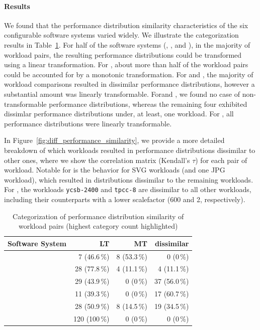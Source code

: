 \paragraph*{Results} {\color{blue} 
We found that the performance distribution similarity characteristics of the six configurable software systems varied widely. We illustrate the categorization results in Table~\ref{tab:categorization}. For half of the software systems (\kanzi, \batik, and \jadx), in the majority of workload pairs, the resulting performance distributions could be transformed using a linear transformation. For \jumper, about more than half of the workload pairs could be accounted for by a monotonic transformation. For \dconvert and \htwo, the majority of workload comparisons resulted in dissimilar performance distributions, however a substantial amount was linearly transformable. For\jumper and \jadx, we found no case of non-transformable performance distributions, whereas the remaining four exhibited dissimlar performance distributions under, at least, one workload. For \jadx, all performance distributions were linearly transformable.

In Figure~\ref{fig:diff_performance_similarity}, we provide a more detailed breakdown of which workloads resulted in performance distributions dissimilar to other ones, where we show the correlation matrix (Kendall's $\tau$) for each pair of workload. Notable for \dconvert is the behavior for SVG workloads (and one JPG workload), which resulted in distributions dissimilar to the remaining workloads. For \htwo, the workloads \texttt{ycsb-2400} and \texttt{tpcc-8} are dissimilar to all other workloads, including their counterparts with a lower scalefactor (600 and 2, respectively).}

\begin{table}
	\caption{Categorization of performance distribution similarity of workload pairs (highest category count highlighted)}
	\begin{tabular}{p{2.4cm}rrr}
		\toprule
		\textbf{Software System} & \textbf{LT} & \textbf{MT} & \textbf{dissimilar}\\
		\midrule
		\jumper &  7 (46.6\,\%) & \cellcolor{nicegreen!20}8 (53.3\,\%)& 0 (0\,\%)\\
		\kanzi &  \cellcolor{nicegreen!20}28 (77.8\,\%)& 4 (11.1\,\%) & 4 (11.1\,\%)\\
		\dconvert &  29 (43.9\,\%) & 0 (0\,\%) & \cellcolor{nicegreen!20}37 (56.0\,\%)\\
		\htwo &  11 (39.3\,\%) & 0 (0\,\%) & \cellcolor{nicegreen!20}17 (60.7\,\%)\\
		\batik &  \cellcolor{nicegreen!20}28 (50.9\,\%) & 8 (14.5\,\%) & 19 (34.5\,\%)\\
		\jadx  &  \cellcolor{nicegreen!20}120 (100\,\%) & 0 (0\,\%) & 0 (0\,\%)\\
		\bottomrule
	\end{tabular}
	\label{tab:categorization}
\end{table}

